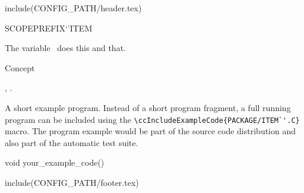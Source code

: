 include(CONFIG_PATH/header.tex)
\begin{ccRefVariable}SCOPE{PREFIX`'ITEM}  %


\ccDefinition
  
The variable \ccRefName\ does this and that.



\ccIsModel

Concept

\ccSeeAlso

,
.

\ccExample

A short example program.
Instead of a short program fragment, a full running program can be
included using the 
\verb|\ccIncludeExampleCode{PACKAGE/ITEM`'.C}| 
macro. The program example would be part of the source code distribution and
also part of the automatic test suite.

\begin{ccExampleCode}
void your_example_code() {
}
\end{ccExampleCode}


\end{ccRefVariable}

include(CONFIG_PATH/footer.tex)
